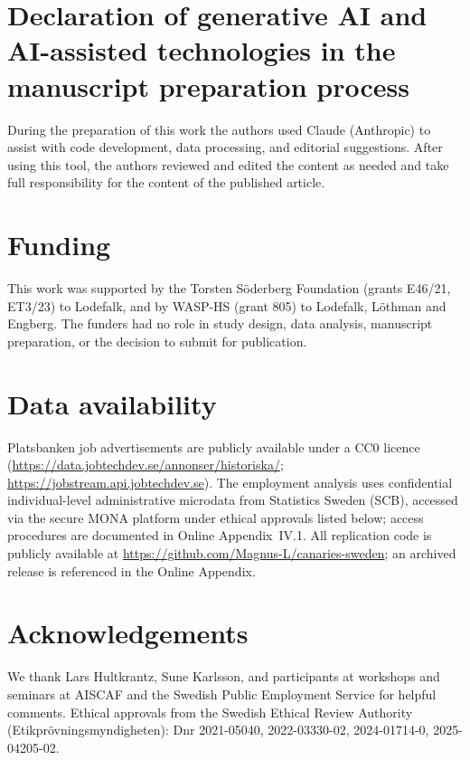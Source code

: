 \documentclass[preprint,12pt,authoryear]{elsarticle}
\begin{document}
\section*{Declaration of generative AI and AI-assisted technologies in the manuscript preparation process}
During the preparation of this work the authors used Claude (Anthropic) to assist with code development, data processing, and editorial suggestions. After using this tool, the authors reviewed and edited the content as needed and take full responsibility for the content of the published article.

\section*{Funding}
This work was supported by the Torsten S\"oderberg Foundation (grants E46/21, ET3/23) to Lodefalk, and by WASP-HS (grant 805) to Lodefalk, L\"othman and Engberg. The funders had no role in study design, data analysis, manuscript preparation, or the decision to submit for publication.

\section*{Data availability}
{\sloppy
Platsbanken job advertisements are publicly available under a CC0 licence (\url{https://data.jobtechdev.se/annonser/historiska/}; \url{https://jobstream.api.jobtechdev.se}). The employment analysis uses confidential individual-level administrative microdata from Statistics Sweden (SCB), accessed via the secure MONA platform under ethical approvals listed below; access procedures are documented in Online Appendix~IV.1. All replication code is publicly available at \url{https://github.com/Magnus-L/canaries-sweden}; an archived release is referenced in the Online Appendix.\par}

\section*{Acknowledgements}
We thank Lars Hultkrantz, Sune Karlsson, and participants at workshops and seminars at AISCAF and the Swedish Public Employment Service for helpful comments. Ethical approvals from the Swedish Ethical Review Authority (Etikpr\"ovningsmyndigheten): Dnr 2021-05040, 2022-03330-02, 2024-01714-0, 2025-04205-02.



\end{document}
